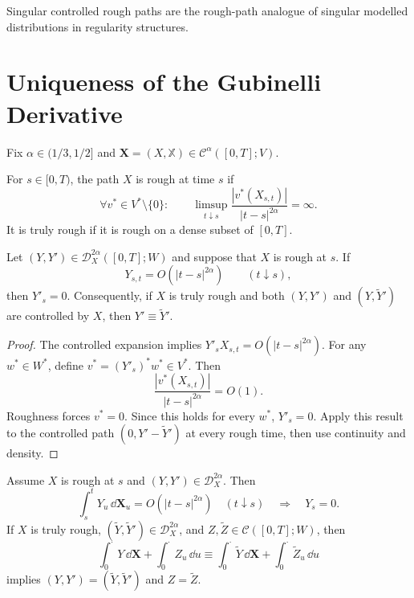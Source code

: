 \begin{remark}
Singular controlled rough paths are the rough-path analogue of singular
modelled distributions in regularity structures.
\end{remark}

\section{Uniqueness of the Gubinelli Derivative}

Fix $\alpha\in(1/3,1/2]$ and
$\mathbf X=(X,\mathbb X)\in\mathscr C^\alpha([0,T];V)$.

\begin{de}
For $s\in[0,T)$, the path $X$ is rough at time $s$ if
\[
  \forall v^*\in V^*\setminus\{0\}:\qquad
  \limsup_{t\downarrow s}
  \frac{|v^*(X_{s,t})|}{|t-s|^{2\alpha}}=\infty.
\]
It is truly rough if it is rough on a dense subset of $[0,T]$.
\end{de}

\begin{prop}
Let $(Y,Y')\in\mathscr D_X^{2\alpha}([0,T];W)$ and suppose that $X$ is rough
at $s$.  If
\[
  Y_{s,t}=O(|t-s|^{2\alpha})\qquad(t\downarrow s),
\]
then $Y'_s=0$.  Consequently, if $X$ is truly rough and both
$(Y,Y')$ and $(Y,\widetilde Y')$ are controlled by $X$, then
$Y'\equiv\widetilde Y'$.
\end{prop}

\begin{proof}
The controlled expansion implies
$Y'_sX_{s,t}=O(|t-s|^{2\alpha})$.  For any $w^*\in W^*$, define
$v^*=(Y'_s)^*w^*\in V^*$.  Then
\[
  \frac{|v^*(X_{s,t})|}{|t-s|^{2\alpha}}=O(1).
\]
Roughness forces $v^*=0$.  Since this holds for every $w^*$, $Y'_s=0$.
Apply this result to the controlled path $(0,Y'-\widetilde Y')$ at every rough
time, then use continuity and density.
\end{proof}

\begin{thm}
Assume $X$ is rough at $s$ and $(Y,Y')\in\mathscr D_X^{2\alpha}$.  Then
\[
  \int_s^tY_u\,\dd\mathbf X_u=O(|t-s|^{2\alpha})
  \quad(t\downarrow s)
  \quad\Longrightarrow\quad Y_s=0.
\]
If $X$ is truly rough,
$(\widetilde Y,\widetilde Y')\in\mathscr D_X^{2\alpha}$, and
$Z,\widetilde Z\in\mathcal C([0,T];W)$, then
\[
  \int_0^\cdot Y\,\dd\mathbf X+\int_0^\cdot Z_u\,\dd u
  \equiv
  \int_0^\cdot\widetilde Y\,\dd\mathbf X
  +\int_0^\cdot\widetilde Z_u\,\dd u
\]
implies $(Y,Y')=(\widetilde Y,\widetilde Y')$ and $Z=\widetilde Z$.
\end{thm}

